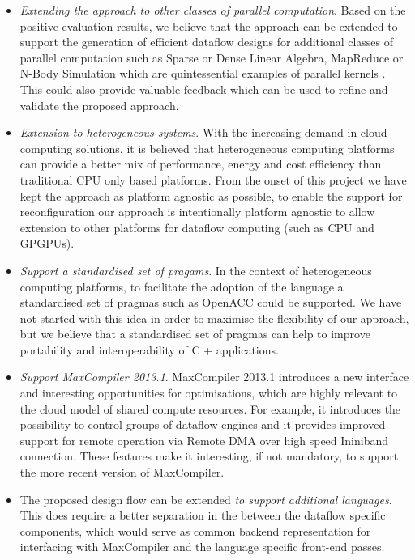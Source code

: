 \begin{itemize}
\item \emph{Extending the approach to other classes of parallel
    computation}.  Based on the positive evaluation results, we
  believe that the approach can be extended to support the generation
  of efficient dataflow designs for additional classes of parallel
  computation such as Sparse or Dense Linear Algebra, MapReduce or
  N-Body Simulation which are quintessential examples of parallel
  kernels
  \cite{Asanovic:Bodik:Catanzaro:Gebis:Husbands:Keutzer:Patterson:Plishker:Shalf:Williams:Yelick:2006}. This
  could also provide valuable feedback which can be used to refine and
  validate the proposed approach.


\item \emph{Extension to heterogeneous systems}. With the increasing
  demand in cloud computing solutions, it is believed that
  heterogeneous computing platforms can provide a better mix of
  performance, energy and cost efficiency than traditional CPU only
  based platforms. From the onset of this project we have kept the
  approach as platform agnostic as possible, to enable the support for  reconfiguration
  our approach is intentionally platform agnostic to allow extension
  to other platforms for dataflow computing (such as CPU and GPGPUs).

\item \emph{Support a standardised set of pragams}. In the context of
  heterogeneous computing platforms, to facilitate the adoption of the
  \FAST{} language a standardised set of pragmas such as OpenACC could
  be supported. We have not started with this idea in order to
  maximise the flexibility of our approach, but we believe that a
  standardised set of pragmas can help to improve portability and
  interoperability of C + \FAST{} applications.

\item \emph{Support MaxCompiler 2013.1}. MaxCompiler 2013.1 introduces
  a new interface and interesting opportunities for optimisations,
  which are highly relevant to the cloud model of shared compute
  resources. For example, it introduces the possibility to control
  groups of dataflow engines and it provides improved support for
  remote operation via Remote DMA over high speed Ininiband
  connection. These features make it interesting, if not mandatory, to
  support the more recent version of MaxCompiler.


\item The proposed design flow can be extended \emph{to support
    additional languages}. This does require a better separation in
  the \fastc{} between the dataflow specific components, which would
  serve as common backend representation for interfacing with
  MaxCompiler and the language specific front-end passes.


\end{itemize}
